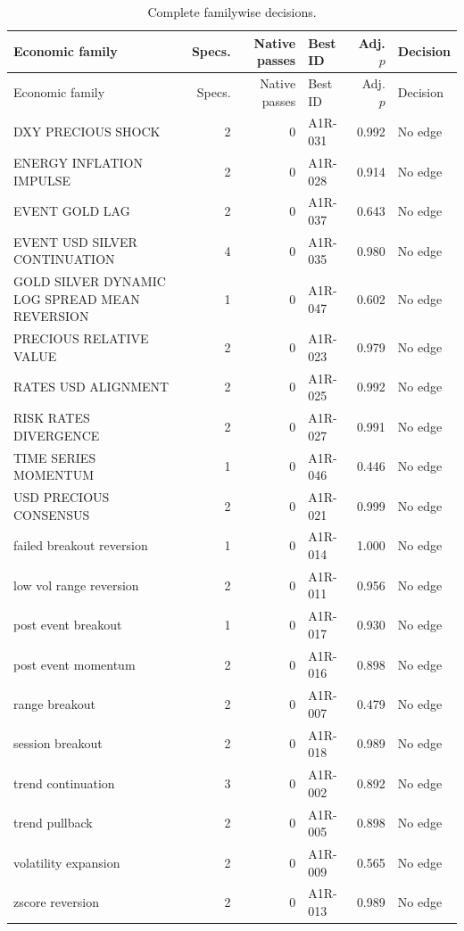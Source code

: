 \begingroup\footnotesize\setlength{\tabcolsep}{3pt}
\begin{longtable}{P{4.1cm}rrlrP{1.6cm}}
\caption{Complete familywise decisions.}\label{tab:s_families}\\
\toprule Economic family & Specs. & Native passes & Best ID & Adj. $p$ & Decision \\
\midrule\endfirsthead
\toprule Economic family & Specs. & Native passes & Best ID & Adj. $p$ & Decision \\
\midrule\endhead
DXY PRECIOUS SHOCK & 2 & 0 & A1R-031 & 0.992 & No edge \\
ENERGY INFLATION IMPULSE & 2 & 0 & A1R-028 & 0.914 & No edge \\
EVENT GOLD LAG & 2 & 0 & A1R-037 & 0.643 & No edge \\
EVENT USD SILVER CONTINUATION & 4 & 0 & A1R-035 & 0.980 & No edge \\
GOLD SILVER DYNAMIC LOG SPREAD MEAN REVERSION & 1 & 0 & A1R-047 & 0.602 & No edge \\
PRECIOUS RELATIVE VALUE & 2 & 0 & A1R-023 & 0.979 & No edge \\
RATES USD ALIGNMENT & 2 & 0 & A1R-025 & 0.992 & No edge \\
RISK RATES DIVERGENCE & 2 & 0 & A1R-027 & 0.991 & No edge \\
TIME SERIES MOMENTUM & 1 & 0 & A1R-046 & 0.446 & No edge \\
USD PRECIOUS CONSENSUS & 2 & 0 & A1R-021 & 0.999 & No edge \\
failed breakout reversion & 1 & 0 & A1R-014 & 1.000 & No edge \\
low vol range reversion & 2 & 0 & A1R-011 & 0.956 & No edge \\
post event breakout & 1 & 0 & A1R-017 & 0.930 & No edge \\
post event momentum & 2 & 0 & A1R-016 & 0.898 & No edge \\
range breakout & 2 & 0 & A1R-007 & 0.479 & No edge \\
session breakout & 2 & 0 & A1R-018 & 0.989 & No edge \\
trend continuation & 3 & 0 & A1R-002 & 0.892 & No edge \\
trend pullback & 2 & 0 & A1R-005 & 0.898 & No edge \\
volatility expansion & 2 & 0 & A1R-009 & 0.565 & No edge \\
zscore reversion & 2 & 0 & A1R-013 & 0.989 & No edge \\
\bottomrule
\end{longtable}
\endgroup
